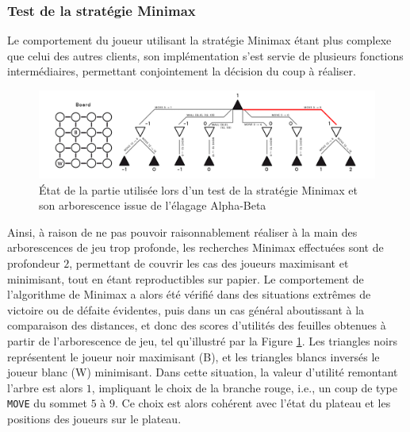 \documentclass[11pt]{article}
\begin{document}
\subsubsection{Test de la stratégie Minimax}

Le comportement du joueur utilisant la stratégie Minimax étant plus complexe que celui des autres clients, son implémentation s'est servie de plusieurs fonctions intermédiaires, permettant conjointement la décision du coup à réaliser. 

\begin{figure}[H]
    \centering
    \includegraphics[width=\textwidth]{Tree_test.png}
    \caption{État de la partie utilisée lors d'un test de la stratégie Minimax et son arborescence issue de l'élagage Alpha-Beta}
    \label{fig:tree_test}
\end{figure}

Ainsi, à raison de ne pas pouvoir raisonnablement réaliser à la main des arborescences de jeu trop profonde, les recherches Minimax effectuées sont de profondeur $2$, permettant de couvrir les cas des joueurs maximisant et minimisant, tout en étant reproductibles sur papier. Le comportement de l'algorithme de Minimax a alors été vérifié dans des situations extrêmes de victoire ou de défaite évidentes, puis dans un cas général aboutissant à la comparaison des distances, et donc des scores d'utilités des feuilles obtenues à partir de l'arborescence de jeu, tel qu'illustré par la Figure \ref{fig:tree_test}. Les triangles noirs représentent le joueur noir maximisant (B), et les triangles blancs inversés le joueur blanc (W) minimisant. Dans cette situation, la valeur d'utilité remontant l'arbre est alors $1$, impliquant le choix de la branche rouge, i.e., un coup de type \texttt{MOVE} du sommet $5$ à $9$. Ce choix est alors cohérent avec l'état du plateau et les positions des joueurs sur le plateau.
\end{document}
